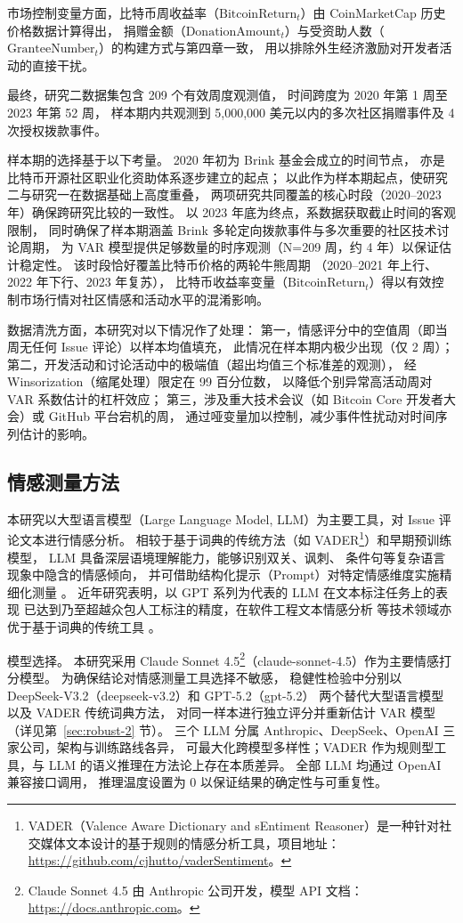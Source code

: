 \documentclass[
    type = master, %
    degree = professional,        %
    decl-page,  %
    twoside,                %
    fontset = fandol %
  ]{njuthesis}
\begin{document}
市场控制变量方面，比特币周收益率（$\text{BitcoinReturn}_t$）由 CoinMarketCap 历史价格数据计算得出，
捐赠金额（$\text{DonationAmount}_t$）与受资助人数（$\text{GranteeNumber}_t$）的构建方式与第四章一致，
用以排除外生经济激励对开发者活动的直接干扰。

最终，研究二数据集包含 209 个有效周度观测值，
时间跨度为 2020 年第 1 周至 2023 年第 52 周，
样本期内共观测到 5,000,000 美元以内的多次社区捐赠事件及 4 次授权拨款事件。

样本期的选择基于以下考量。
2020 年初为 Brink 基金会成立的时间节点，
亦是比特币开源社区职业化资助体系逐步建立的起点；
以此作为样本期起点，使研究二与研究一在数据基础上高度重叠，
两项研究共同覆盖的核心时段（2020--2023 年）确保跨研究比较的一致性。
以 2023 年底为终点，系数据获取截止时间的客观限制，
同时确保了样本期涵盖 Brink 多轮定向拨款事件与多次重要的社区技术讨论周期，
为 VAR 模型提供足够数量的时序观测（N=209 周，约 4 年）以保证估计稳定性。
该时段恰好覆盖比特币价格的两轮牛熊周期
（2020--2021 年上行、2022 年下行、2023 年复苏），
比特币收益率变量（$\text{BitcoinReturn}_t$）得以有效控制市场行情对社区情感和活动水平的混淆影响。

数据清洗方面，本研究对以下情况作了处理：
第一，情感评分中的空值周（即当周无任何 Issue 评论）以样本均值填充，
此情况在样本期内极少出现（仅 2 周）；
第二，开发活动和讨论活动中的极端值（超出均值三个标准差的观测），
经 Winsorization（缩尾处理）限定在 99 百分位数，
以降低个别异常高活动周对 VAR 系数估计的杠杆效应；
第三，涉及重大技术会议（如 Bitcoin Core 开发者大会）或 GitHub 平台宕机的周，
通过哑变量加以控制，减少事件性扰动对时间序列估计的影响。

\subsection{情感测量方法}

本研究以大型语言模型（Large Language Model, LLM）为主要工具，对 Issue 评论文本进行情感分析。
相较于基于词典的传统方法（如 VADER\footnote{VADER（Valence Aware Dictionary and sEntiment Reasoner）是一种针对社交媒体文本设计的基于规则的情感分析工具，项目地址：\url{https://github.com/cjhutto/vaderSentiment}。}）和早期预训练模型，
LLM 具备深层语境理解能力，能够识别双关、讽刺、
条件句等复杂语言现象中隐含的情感倾向，
并可借助结构化提示（Prompt）对特定情感维度实施精细化测量
\cite{gilardi2023chatgpt}。
近年研究表明，以 GPT 系列为代表的 LLM 在文本标注任务上的表现
已达到乃至超越众包人工标注的精度，在软件工程文本情感分析
等技术领域亦优于基于词典的传统工具
\cite{zhang2020sentiment}。

模型选择。
本研究采用 Claude Sonnet 4.5\footnote{Claude Sonnet 4.5 由 Anthropic 公司开发，模型 API 文档：\url{https://docs.anthropic.com}。}（claude-sonnet-4.5）作为主要情感打分模型。
为确保结论对情感测量工具选择不敏感，
稳健性检验中分别以 DeepSeek-V3.2（deepseek-v3.2）和 GPT-5.2（gpt-5.2）
两个替代大型语言模型以及 VADER 传统词典方法，
对同一样本进行独立评分并重新估计 VAR 模型（详见第~\ref{sec:robust-2} 节）。
三个 LLM 分属 Anthropic、DeepSeek、OpenAI 三家公司，架构与训练路线各异，
可最大化跨模型多样性；VADER 作为规则型工具，与 LLM 的语义推理在方法论上存在本质差异。
全部 LLM 均通过 OpenAI 兼容接口调用，
推理温度设置为 0 以保证结果的确定性与可重复性。
\end{document}
